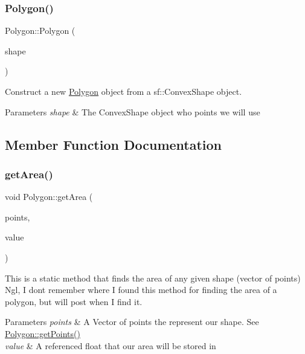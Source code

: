 \subsubsection{\texorpdfstring{Polygon()}{Polygon()}\hspace{0.1cm}{\footnotesize\ttfamily [5/5]}}
{\footnotesize\ttfamily Polygon\+::\+Polygon (\begin{DoxyParamCaption}\item[{Convex\+Shape}]{shape }\end{DoxyParamCaption})}



Construct a new \mbox{\hyperlink{class_polygon}{Polygon}} object from a sf\+::\+Convex\+Shape object. 


\begin{DoxyParams}{Parameters}
{\em shape} & The Convex\+Shape object who points we will use \\
\hline
\end{DoxyParams}


\subsection{Member Function Documentation}
\mbox{\label{class_polygon_a21a607cdb559f8e4a98fa54d0b9d63a9}} 
\subsubsection{\texorpdfstring{getArea()}{getArea()}\hspace{0.1cm}{\footnotesize\ttfamily [1/2]}}
{\footnotesize\ttfamily void Polygon\+::get\+Area (\begin{DoxyParamCaption}\item[{vector$<$ Vector2f $>$}]{points,  }\item[{float \&}]{value }\end{DoxyParamCaption})\hspace{0.3cm}{\ttfamily [static]}}



This is a static method that finds the area of any given shape (vector of points) Ngl, I don\textquotesingle{}t remember where I found this method for finding the area of a polygon, but will post when I find it. 


\begin{DoxyParams}{Parameters}
{\em points} & A Vector of points the represent our shape. See \mbox{\hyperlink{class_polygon_a5013385231c9027d00cb57dffc030ae4}{Polygon\+::get\+Points()}} \\
\hline
{\em value} & A referenced float that our area will be stored in \\
\hline
\end{DoxyParams}
\mbox{\label{class_polygon_a00dc79655e7be6b73a83414a6733ec9a}} 
